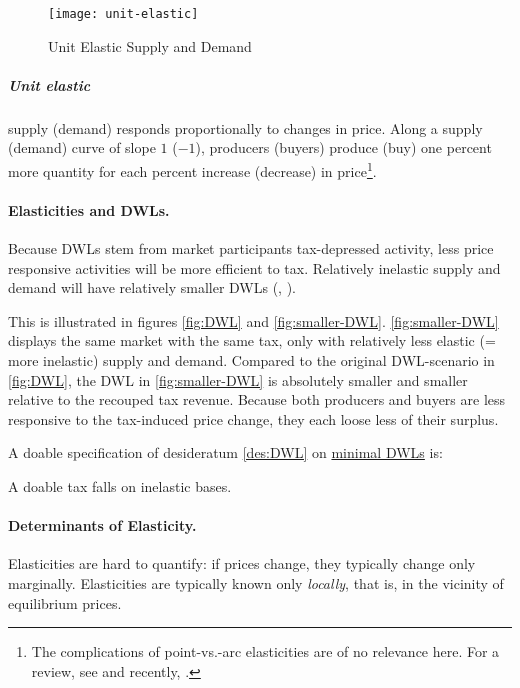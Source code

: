  \begin{figure}[htbp]
	\centering
	\texttt{[image: unit-elastic]}
	\caption{Unit Elastic Supply and Demand}
	\label{fig:UnitElastic}
\end{figure}

\subparagraph{Unit elastic} supply (demand) responds proportionally to changes in price.
Along a supply (demand) curve of slope $1$ ($-1$), producers (buyers) produce (buy) one percent more quantity for each percent increase (decrease) in price\footnote{The complications of point-vs.-arc elasticities are of no relevance here.
For a review, see \cite{Allen1933} and recently, \cite{Vaughan1988}.}.

\paragraph{Elasticities and DWLs.} Because DWLs stem from market participants tax-depressed activity, less price responsive activities will be more efficient to tax.
Relatively inelastic supply and demand will have relatively smaller DWLs (\citealt{Ramsey}, \citealt[16]{Piatkowski2008}).


This is illustrated in figures \ref{fig:DWL} and \ref{fig:smaller-DWL}.
\autoref{fig:smaller-DWL} displays the same market with the same tax, only with relatively less elastic (= more inelastic) supply and demand.
Compared to the original DWL-scenario in \autoref{fig:DWL}, the DWL in \autoref{fig:smaller-DWL} is absolutely smaller and smaller relative to the recouped tax revenue.
Because both producers and buyers are less responsive to the tax-induced price change, they each loose less of their surplus.

A doable specification of desideratum \ref{des:DWL} on \href{des:DWL}{minimal DWLs} is:

\begin{desideratum}
	A doable tax falls on inelastic bases.
	\label{des:tax-inelastic}
\end{desideratum}

\paragraph{Determinants of Elasticity.} Elasticities are hard to quantify:
if prices change, they typically change only marginally.
Elasticities are typically known only \emph{locally}, that is, in the vicinity of equilibrium prices.


